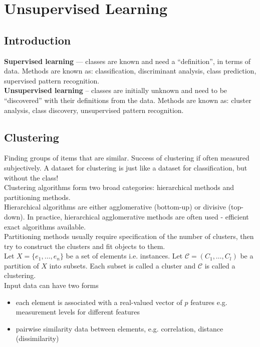 \section{Unsupervised Learning}

\subsection{Introduction}

\textbf{Supervised learning} --- classes are known and need a ``definition'', in terms of data. Methods are known as: classification, discriminant analysis, class prediction, supervised pattern recognition. \\

\textbf{Unsupervised learning} -- classes are initially unknown and need to be ``discovered'' with their definitions from the data. Methods are known as: cluster analysis, class discovery, unsupervised pattern recognition.

\subsection{Clustering}

Finding groups of items that are similar. Success of clustering if often measured subjectively. A dataset for clustering is just like a dataset for classification, but without the class! \\

Clustering algorithms form two broad categories: hierarchical methods and partitioning methods. \\

Hierarchical algorithms are either agglomerative (bottom-up) or divisive (top-down). In practice, hierarchical agglomerative methods are often used - efficient exact algorithms available. \\

Partitioning methods usually require specification of the number of clusters, then try to construct the clusters and fit objects to them. \\

Let \(X = \{e_1, \dots, e_n\}\) be a set of elements i.e. instances. Let \(\mathcal{C} = (C_1, \dots, C_l)\) be a partition of \(X\) into subsets. Each subset is called a cluster and \(\mathcal{C}\) is called a clustering. \\

Input data can have two forms
\begin{itemize}
    \item each element is associated with a real-valued vector of \(p\) features e.g. measurement levels for different features
    \item pairwise similarity data between elements, e.g. correlation, distance (dissimilarity)
\end{itemize}

